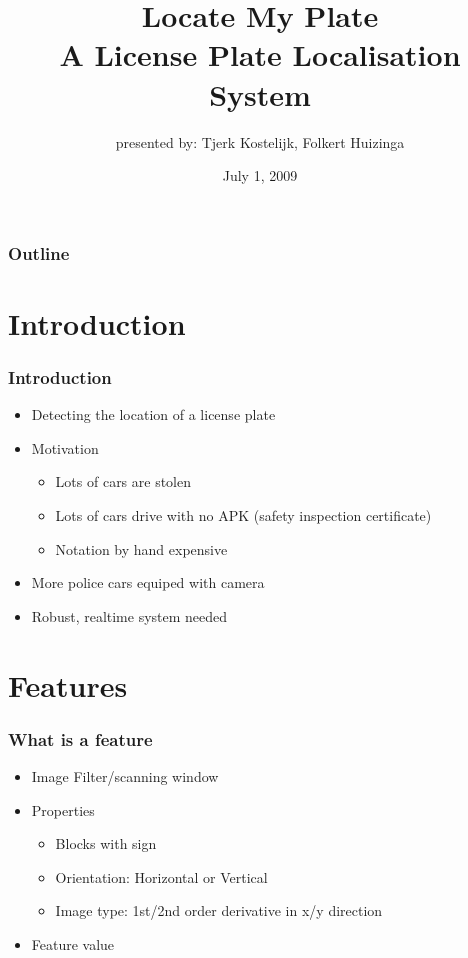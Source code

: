 \documentclass{beamer}
\title{Locate My Plate \\ A License Plate Localisation System}
\subtitle{presented by: Tjerk Kostelijk, Folkert Huizinga}
\date{July 1, 2009}
\begin{document}
\frame{\titlepage}

\setcounter{tocdepth}{1}

\frame
{
  \frametitle{Outline}
  \small
  \tableofcontents
  \normalsize
}

\setcounter{tocdepth}{2}



\section{Introduction}
\frame
{
  \frametitle{Introduction}
	
  \begin{itemize}
		\item <+-| alert@+> Detecting the location of a license plate 
		\item <+-| alert@+> Motivation
		\begin{itemize}
			\item <+-| alert@+> Lots of cars are stolen
			\item <+-| alert@+> Lots of cars drive with no APK (safety inspection certificate)
			\item <+-| alert@+> Notation by hand expensive
		\end{itemize}
		\item <+-| alert@+> More police cars equiped with camera 
		\item <+-| alert@+> Robust, realtime system needed
  \end{itemize}
}

\section{Features}
\frame
{
  \frametitle{What is a feature}
	
  \begin{itemize}
  \item <+-| alert@+> Image Filter/scanning window
  \item <+-| alert@+> Properties
		\begin{itemize}
			\item <+-| alert@+> Blocks with sign 
			\item <+-| alert@+> Orientation: Horizontal or Vertical
			\item <+-| alert@+> Image type: 1st/2nd order derivative in x/y direction
		\end{itemize}
  \item <+-| alert@+> Feature value
  \end{itemize}
}
\end{document}
